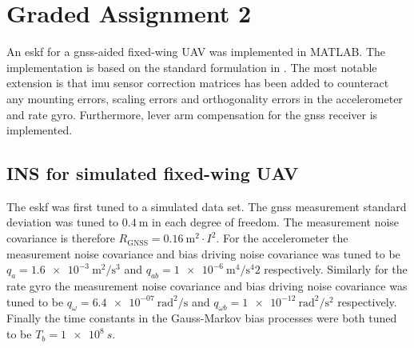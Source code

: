 \section{Graded Assignment 2}\label{sec:graded_assignment_2}


An \acrfull{eskf} for a \acrshort{gnss}-aided fixed-wing UAV was implemented in MATLAB. The implementation is based on the standard formulation in \cite{Sola}. The most notable extension is that \acrshort{imu} sensor correction matrices has been added to counteract any mounting errors, scaling errors and orthogonality errors in the accelerometer and rate gyro. Furthermore, lever arm compensation for the \acrshort{gnss} receiver is implemented.

\subsection{INS for simulated fixed-wing UAV}





The \acrshort{eskf} was first tuned to a simulated data set. The \acrshort{gnss} measurement standard deviation was tuned to $\SI{0.4}{\meter}$ in each degree of freedom. The measurement noise covariance is therefore $R_{\text{GNSS}} = \SI{0.16}{\meter\squared} \cdot I^2$. For the accelerometer the measurement noise covariance and bias driving noise covariance was tuned to be $q_{a} = \SI{1.6e-3}{\meter\squared\per\second\cubed}$ and $ q_{ab} = \SI{1e-6}{\meter\tothe{4}\per\second\tothe{4}}2$ respectively. Similarly for the rate gyro the measurement noise covariance and bias driving noise covariance was tuned to be $q_{\omega} = \SI{6.4e-07}{\radian\squared\per\second}$ and $q_{\omega b} = \SI{1e-12}{\radian\squared\per\second\squared}$ respectively. Finally the time constants in the Gauss-Markov bias processes were both tuned to be $T_b = \SI{1e8}{s}$.

